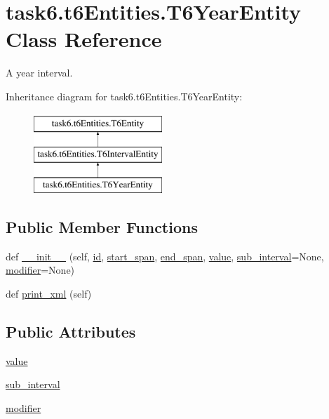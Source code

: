 \hypertarget{classtask6_1_1t6Entities_1_1T6YearEntity}{}\section{task6.\+t6\+Entities.\+T6\+Year\+Entity Class Reference}
\label{classtask6_1_1t6Entities_1_1T6YearEntity}


A year interval.  


Inheritance diagram for task6.\+t6\+Entities.\+T6\+Year\+Entity\+:\begin{figure}[H]
\begin{center}
\leavevmode
\includegraphics[height=3.000000cm]{classtask6_1_1t6Entities_1_1T6YearEntity}
\end{center}
\end{figure}
\subsection*{Public Member Functions}
\begin{DoxyCompactItemize}
\item 
def \hyperlink{classtask6_1_1t6Entities_1_1T6YearEntity_aaffc08b30d7c9ec3032a026aef3ab88d}{\+\_\+\+\_\+init\+\_\+\+\_\+} (self, \hyperlink{classtask6_1_1t6Entities_1_1T6Entity_afeeced8134bb3ebe0cfecc64d0ab46a4}{id}, \hyperlink{classtask6_1_1t6Entities_1_1T6Entity_a52779e9af8864dc98e8b02fc5b9b041a}{start\+\_\+span}, \hyperlink{classtask6_1_1t6Entities_1_1T6Entity_aeb402200b156cd9562c5111dfe777b98}{end\+\_\+span}, \hyperlink{classtask6_1_1t6Entities_1_1T6YearEntity_a5ac04f619f697c6e554af341bd3b379c}{value}, \hyperlink{classtask6_1_1t6Entities_1_1T6YearEntity_aa2f25b97805acffd72e3bcefed8f1278}{sub\+\_\+interval}=None, \hyperlink{classtask6_1_1t6Entities_1_1T6YearEntity_aaf9c16741784fcab82b65f305fb19851}{modifier}=None)
\item 
def \hyperlink{classtask6_1_1t6Entities_1_1T6YearEntity_a81385cbdd56fb486b73765bc7a01ead0}{print\+\_\+xml} (self)
\end{DoxyCompactItemize}
\subsection*{Public Attributes}
\begin{DoxyCompactItemize}
\item 
\hyperlink{classtask6_1_1t6Entities_1_1T6YearEntity_a5ac04f619f697c6e554af341bd3b379c}{value}
\item 
\hyperlink{classtask6_1_1t6Entities_1_1T6YearEntity_aa2f25b97805acffd72e3bcefed8f1278}{sub\+\_\+interval}
\item 
\hyperlink{classtask6_1_1t6Entities_1_1T6YearEntity_aaf9c16741784fcab82b65f305fb19851}{modifier}
\end{DoxyCompactItemize}


